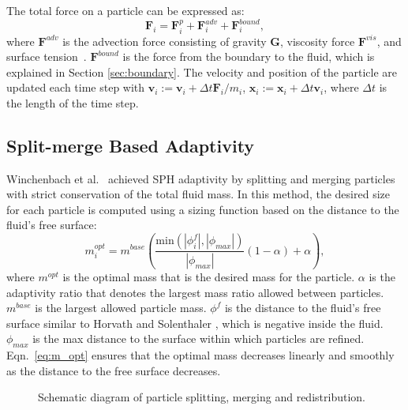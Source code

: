\documentclass[VANCOUVER,STIX1COL]{WileyNJD-v2}
\begin{document}
The total force on a particle can be expressed as:
\begin{equation}
    \mathbf{F}_i = \mathbf{F}_i^p + \mathbf{F}_i^{adv} + \mathbf{F}_i^{bound},
\end{equation}
where $\mathbf{F}^{adv}$ is the advection force consisting of gravity $\mathbf{G}$, viscosity force $\mathbf{F}^{vis}$, and surface tension~\cite{Akinci13}. $\mathbf{F}^{bound}$ is the force from the boundary to the fluid, which is explained in Section \ref{sec:boundary}. The velocity and position of the particle are updated each time step with $\mathbf{v}_i := \mathbf{v}_i + \Delta t \mathbf{F}_i / m_i$, $\mathbf{x}_i := \mathbf{x}_i + \Delta t \mathbf{v}_i$, where $\Delta t$ is the length of the time step.

\subsection{Split-merge Based Adaptivity}

Winchenbach et al.~\cite{Winchenbach17} achieved SPH adaptivity by splitting and merging particles with strict conservation of the total fluid mass. In this method, the desired size for each particle is computed using a sizing function based on the distance to the fluid's free surface:
\begin{equation}
    m_i^{opt} = m^{base}\left(
    \frac{\mathrm{min}(|\phi_i^f|,|\phi_{max}|)}{|\phi_{max}|}
    (1 - \alpha) + \alpha
    \right),
    \label{eq:m_opt}
\end{equation}
where $m^{opt}$ is the optimal mass that is the desired mass for the particle. $\alpha$ is the adaptivity ratio that denotes the largest mass ratio allowed between particles. $m^{base}$ is the largest allowed particle mass. $\phi^f$ is the distance to the fluid's free surface similar to Horvath and Solenthaler \cite{Horvath13}, which is negative inside the fluid. $\phi_{max}$ is the max distance to the surface within which particles are refined. Eqn.~\ref{eq:m_opt} ensures that the optimal mass decreases linearly and smoothly as the distance to the free surface decreases.

\begin{figure}[b]
    \centering
    \vspace{-0.7\baselineskip}
    \caption{Schematic diagram of particle splitting, merging and redistribution.}
    \label{fig:split_schem}
\end{figure}
\end{document}
